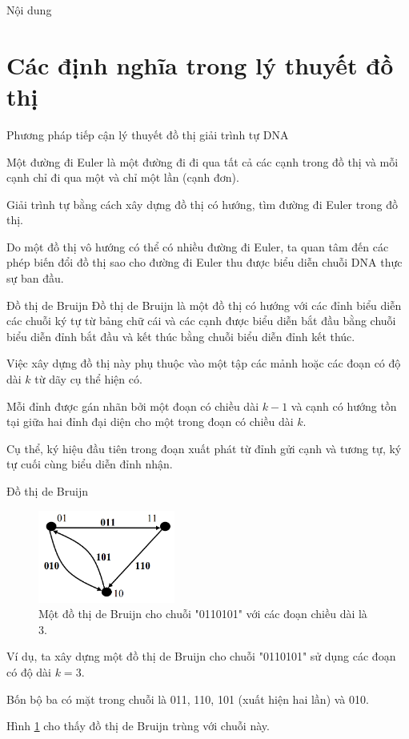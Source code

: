 \documentclass[10pt]{beamer}
\theoremstyle{remark}
\numberwithin{algocf}{section}
\numberwithin{equation}{section}
\numberwithin{dl}{section}
\numberwithin{figure}{section}
\begin{document}
\begin{frame}{Nội dung}
    \tableofcontents[hidesubsections]
\end{frame}

\section{Các định nghĩa trong lý thuyết đồ thị}

\begin{frame}{Phương pháp tiếp cận lý thuyết đồ thị giải trình tự DNA}

    Một đường đi Euler là một đường đi đi qua tất cả các cạnh trong đồ thị và mỗi cạnh chỉ đi qua một và chỉ một lần (cạnh đơn).

    Giải trình tự bằng cách xây dựng đồ thị có hướng, tìm đường đi Euler trong đồ thị.

    Do một đồ thị vô hướng có thể có nhiều đường đi Euler, ta quan tâm đến các phép biến đổi đồ thị sao cho đường đi Euler thu được biểu diễn chuỗi DNA thực sự ban đầu.

    
\end{frame}

\begin{frame}{Đồ thị de Bruijn}
    Đồ thị de Bruijn là một đồ thị có hướng với các đỉnh biểu diễn các chuỗi ký tự từ bảng chữ cái và các cạnh được biểu diễn bắt đầu bằng chuỗi biểu diễn đỉnh bắt đầu và kết thúc bằng chuỗi biểu diễn đỉnh kết thúc.

    Việc xây dựng đồ thị này phụ thuộc vào một tập các mảnh hoặc các đoạn có độ dài $k$ từ dãy cụ thể hiện có.

    Mỗi đỉnh được gán nhãn bởi một đoạn có chiều dài $k-1$ và cạnh có hướng tồn tại giữa hai đỉnh đại diện cho một trong đoạn có chiều dài $k$.

    Cụ thể, ký hiệu đầu tiên trong đoạn xuất phát từ đỉnh gửi cạnh và tương tự, ký tự cuối cùng biểu diễn đỉnh nhận.

\end{frame}

\begin{frame}{Đồ thị de Bruijn}
    \begin{figure}[h!]
        \centering
        \includegraphics[width=0.4\textwidth]{1.png}
        \caption{Một đồ thị de Bruijn cho chuỗi "0110101" với các đoạn chiều dài là 3.}
        \label{fig:1}
    \end{figure}

    Ví dụ, ta xây dựng một đồ thị de Bruijn cho chuỗi "0110101" sử dụng các đoạn có độ dài $k=3$.

    Bốn bộ ba có mặt trong chuỗi là 011, 110, 101 (xuất hiện hai lần) và 010.
    
    Hình \ref{fig:1} cho thấy đồ thị de Bruijn trùng với chuỗi này.
\end{frame}
\end{document}
